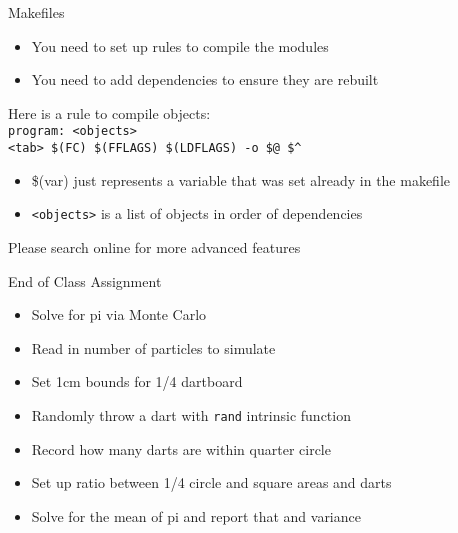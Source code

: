 \documentclass{beamer}
\begin{document}
\begin{frame}{Makefiles}

  \begin{itemize}
    \item You need to set up rules to compile the modules
    \vfill\item You need to add dependencies to ensure they are rebuilt
  \end{itemize}
  \vfill
  Here is a rule to compile objects: \\
  \texttt{program: <objects>} \\
  \texttt{<tab> \$(FC) \$(FFLAGS) \$(LDFLAGS) -o \$@ \$\^}
  \begin{itemize}
    \vfill\item \$(var) just represents a variable that was set already in the makefile
    \vfill\item \texttt{<objects>} is a list of objects in order of dependencies
  \end{itemize}
  \begin{center}
    \alert{Please search online for more advanced features}
  \end{center}

\end{frame}
\begin{frame}{End of Class Assignment}

  \begin{itemize}
    \item Solve for pi via Monte Carlo
    \vfill\item Read in number of particles to simulate
    \vfill\item Set 1cm bounds for 1/4 dartboard
    \vfill\item Randomly throw a dart with \texttt{rand} intrinsic function
    \vfill\item Record how many darts are within quarter circle
    \vfill\item Set up ratio between 1/4 circle and square areas and darts
    \vfill\item Solve for the mean of pi and report that and variance
  \end{itemize}

\end{frame}
\end{document}
